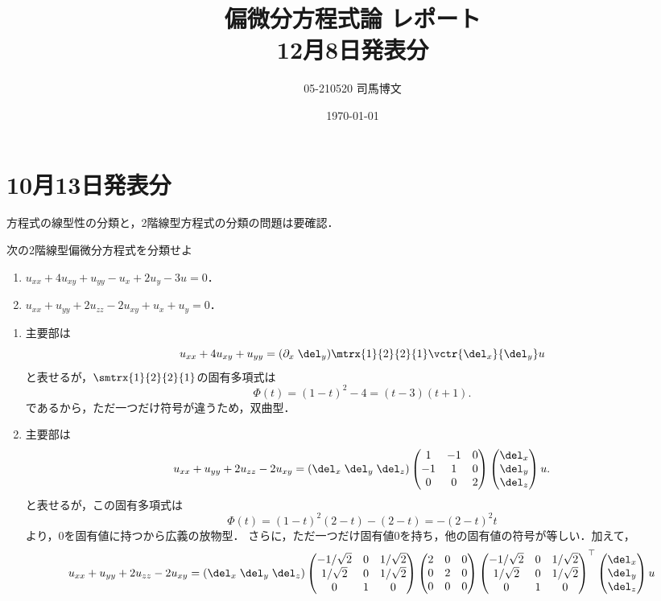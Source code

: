 \documentclass[uplatex,dvipdfmx]{jsarticle}
\title{偏微分方程式論 レポート\\12月8日発表分}\author{05-210520 司馬博文}\date{\today}
\begin{document}
\tableofcontents

\section{10月13日発表分}

方程式の線型性の分類と，2階線型方程式の分類の問題は要確認．

\begin{problem}
    次の2階線型偏微分方程式を分類せよ
    \begin{enumerate}
        \item $u_{xx}+4u_{xy}+u_{yy}-u_x+2u_y-3u=0$．
        \item $u_{xx}+u_{yy}+2u_{zz}-2u_{xy}+u_x+u_y=0$．
    \end{enumerate}
\end{problem}
\begin{Proof}\mbox{}
    \begin{enumerate}
        \item 主要部は
        \[u_{xx}+4u_{xy}+u_{yy}=(\partial_x\;\del_y)\mtrx{1}{2}{2}{1}\vctr{\del_x}{\del_y}u\]
        と表せるが，$\smtrx{1}{2}{2}{1}$の固有多項式は
        \[\Phi(t)=(1-t)^2-4=(t-3)(t+1).\]
        であるから，ただ一つだけ符号が違うため，双曲型．
        \item 主要部は
        \[u_{xx}+u_{yy}+2u_{zz}-2u_{xy}=(\del_x\;\del_y\;\del_z)\begin{pmatrix}1&-1&0\\-1&1&0\\0&0&2\end{pmatrix}\begin{pmatrix}\del_x\\\del_y\\\del_z\end{pmatrix}u.\]
        と表せるが，この固有多項式は
        \[\Phi(t)=(1-t)^2(2-t)-(2-t)=-(2-t)^2t\]
        より，$0$を固有値に持つから広義の放物型．
        さらに，ただ一つだけ固有値$0$を持ち，他の固有値の符号が等しい．加えて，
        \[u_{xx}+u_{yy}+2u_{zz}-2u_{xy}=(\del_x\;\del_y\;\del_z)\begin{pmatrix}-1/\sqrt{2}&0&1/\sqrt{2}\\1/\sqrt{2}&0&1/\sqrt{2}\\0&1&0\end{pmatrix}\begin{pmatrix}2&0&0\\0&2&0\\0&0&0\end{pmatrix}\begin{pmatrix}-1/\sqrt{2}&0&1/\sqrt{2}\\1/\sqrt{2}&0&1/\sqrt{2}\\0&1&0\end{pmatrix}^\top\begin{pmatrix}\del_x\\\del_y\\\del_z\end{pmatrix}u\]

\end{enumerate}
\end{Proof}
\end{document}
